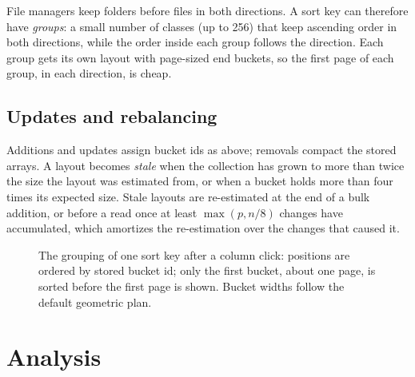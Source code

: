 \documentclass[11pt]{article}
\theoremstyle{definition}
\begin{document}
File managers keep folders before files in both directions. A sort key can
therefore have \emph{groups}: a small number of classes (up to 256) that keep
ascending order in both directions, while the order inside each group follows
the direction. Each group gets its own layout with page-sized end buckets, so
the first page of each group, in each direction, is cheap.

\subsection{Updates and rebalancing}

Additions and updates assign bucket ids as above; removals compact the stored
arrays. A layout becomes \emph{stale} when the collection has grown to more than
twice the size the layout was estimated from, or when a bucket holds more than
four times its expected size. Stale layouts are re-estimated at the end of a
bulk addition, or before a read once at least $\max(p, n/8)$ changes have
accumulated, which amortizes the re-estimation over the changes that caused it.

\begin{figure}[t]
\centering
{}
\caption{The grouping of one sort key after a column click: positions are
ordered by stored bucket id; only the first bucket, about one page, is sorted
before the first page is shown. Bucket widths follow the default geometric
plan.}
\label{fig:grouping}
\end{figure}

\section{Analysis}\label{sec:analysis}
\end{document}
